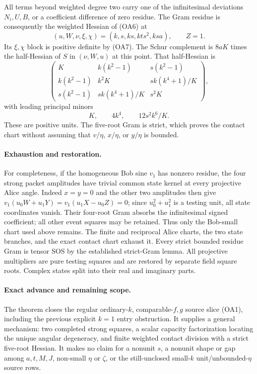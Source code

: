 All terms beyond weighted degree two carry one of the infinitesimal
deviations $N_i,U,B$, or a coefficient difference of zero residue.
The Gram residue is consequently the weighted Hessian of (OA6) at
\[
 (u,W,\nu,\xi,\chi)=(k,s,ks,kts^2,ksa),\qquad Z=1.
\]
Its $\xi,\chi$ block is positive definite by (OA7).
The Schur complement is $8aK$ times the half-Hessian of $S$ in
$(\nu,W,u)$ at this point. That half-Hessian is
\[
 \begin{pmatrix}
 K&k(k^2-1)&s(k^2-1)\\
 k(k^2-1)&k^2K&sk(k^4+1)/K\\
 s(k^2-1)&sk(k^4+1)/K&s^2K
 \end{pmatrix},                                      \tag{OA15}
\]
with leading principal minors
\[
                    K,\qquad4k^4,\qquad12s^2k^6/K.
                                                        \tag{OA16}
\]
These are positive units. The five-root Gram is strict, which proves
the contact chart without assuming that $v/\eta$, $x/\eta$, or
$y/\eta$ is bounded.

\paragraph{Exhaustion and restoration.}
For completeness, if the homogeneous Bob sine $v_1$ has nonzero
residue, the four strong packet amplitudes have trivial common state
kernel at every projective Alice angle. Indeed $x=y=0$ and the other
two amplitudes then give
$v_1(u_0W+u_1Y)=v_1(u_1X-u_0Z)=0$; since
$u_0^2+u_1^2$ is a testing unit, all state coordinates vanish.
Their four-root Gram absorbs the infinitesimal signed coefficient;
all other event squares may be retained. Thus only the Bob-small
chart used above remains. The finite and reciprocal Alice charts,
the two state branches, and the exact contact chart exhaust it.
Every strict bounded residue Gram is tensor SOS by the established
strict-Gram lemma. All projective multipliers are pure testing squares
and are restored by separate field square roots. Complex states split
into their real and imaginary parts.

\paragraph{Exact advance and remaining scope.}
The theorem closes the regular ordinary-$k$, comparable-$f,g$ source
slice (OA1), including the previous explicit $k=1$ entry obstruction.
It supplies a general mechanism: two completed strong squares, a
scalar capacity factorization locating the unique angular degeneracy,
and finite weighted contact division with a strict five-root Hessian.
It makes no claim for a nonunit $s$, a nonunit shape or gap among
$a,t,M,J$, non-small $\eta$ or $\zeta$, or the still-unclosed
small-$k$ unit/unbounded-$\eta$ source rows.



